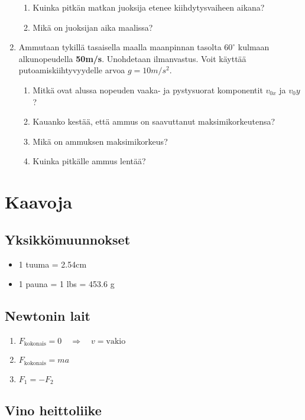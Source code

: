 \documentclass[12pt]{article}
\begin{document}
\begin{enumerate}
\begin{enumerate}
\item Kuinka pitkän matkan juoksija etenee kiihdytysvaiheen aikana?
\item Mikä on juoksijan aika maalissa?
\end{enumerate}
\item Ammutaan tykillä tasaisella maalla maanpinnan tasolta $60^\circ$
kulmaan alkunopeudella \textbf{50m/s}. Unohdetaan ilmanvastus. Voit käyttää putoamiskiihtyvyydelle arvoa $g=10m/s^2$.
\begin{enumerate}
\item Mitkä ovat alussa nopeuden vaaka- ja pystysuorat komponentit $v_{0x}$ ja $v_0y$?
\item Kauanko kestää, että ammus on saavuttanut maksimikorkeutensa?
\item Mikä on ammuksen maksimikorkeus?
\item Kuinka pitkälle ammus lentää?
\end{enumerate}
\end{enumerate}

\section*{Kaavoja}

\subsection*{Yksikkömuunnokset}
\begin{itemize}
\item 1 tuuma = 2.54cm
\item 1 pauna = 1 lbs = 453.6 g
\end{itemize}

\subsection*{Newtonin lait}
\begin{enumerate}
\item $F_{\textrm{kokonais}}=0 \quad\Rightarrow\quad v=\textrm{vakio}$
\item $F_{\textrm{kokonais}}=ma$
\item $F_1=-F_2$
\end{enumerate}

\subsection*{Vino heittoliike}
\end{document}
